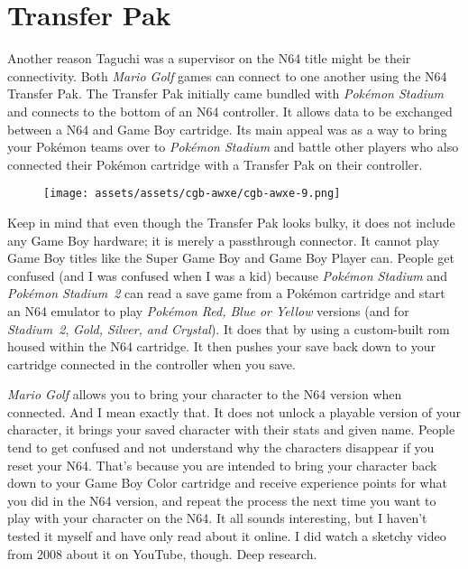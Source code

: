 \documentclass{book}
\begin{document}
\FloatBarrier\needspace{5pt}\section*{Transfer Pak}\nopagebreak[4]

Another reason Taguchi was a supervisor on the N64 title might be their connectivity. Both \emph{Mario Golf} games can connect to one another using the N64 Transfer Pak. The Transfer Pak initially came bundled with \emph{Pokémon Stadium} and connects to the bottom of an N64 controller. It allows data to be exchanged between a N64 and Game Boy cartridge. Its main appeal was as a way to bring your Pokémon teams over to \emph{Pokémon Stadium} and battle other players who also connected their Pokémon cartridge with a Transfer Pak on their controller.

\begin{figure}[hbt]
\vskip 10pt
\centering \texttt{[image: assets/assets/cgb-awxe/cgb-awxe-9.png]}
\vskip 6pt
\end{figure}

Keep in mind that even though the Transfer Pak looks bulky, it does not include any Game Boy hardware; it is merely a passthrough connector. It cannot play Game Boy titles like the Super Game Boy and Game Boy Player can. People get confused (and I was confused when I was a kid) because \emph{Pokémon Stadium} and \emph{Pokémon Stadium 2} can read a save game from a Pokémon cartridge and start an N64 emulator to play \emph{Pokémon Red, Blue or Yellow} versions (and for \emph{Stadium 2}, \emph{Gold, Silver, and Crystal}). It does that by using a custom-built rom housed within the N64 cartridge. It then pushes your save back down to your cartridge connected in the controller when you save.

\emph{Mario Golf} allows you to bring your character to the N64 version when connected. And I mean exactly that. It does not unlock a playable version of your character, it brings your saved character with their stats and given name. People tend to get confused and not understand why the characters disappear if you reset your N64. That’s because you are intended to bring your character back down to your Game Boy Color cartridge and receive experience points for what you did in the N64 version, and repeat the process the next time you want to play with your character on the N64. It all sounds interesting, but I haven’t tested it myself and have only read about it online. I did watch a sketchy video from 2008 about it on YouTube, though. Deep research.
\end{document}
